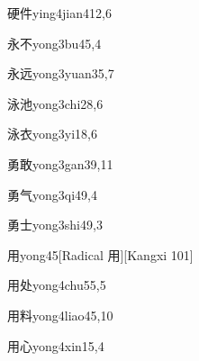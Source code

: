 \begin{entry}{硬件}{ying4jian4}{12,6}
\end{entry}

\begin{entry}{永不}{yong3bu4}{5,4}
\end{entry}

\begin{entry}{永远}{yong3yuan3}{5,7}
\end{entry}

\begin{entry}{泳池}{yong3chi2}{8,6}
\end{entry}

\begin{entry}{泳衣}{yong3yi1}{8,6}
\end{entry}

\begin{entry}{勇敢}{yong3gan3}{9,11}
\end{entry}

\begin{entry}{勇气}{yong3qi4}{9,4}
\end{entry}

\begin{entry}{勇士}{yong3shi4}{9,3}
\end{entry}

\begin{entry}{用}{yong4}{5}[Radical 用][Kangxi 101]
\end{entry}

\begin{entry}{用处}{yong4chu5}{5,5}
\end{entry}

\begin{entry}{用料}{yong4liao4}{5,10}
\end{entry}

\begin{entry}{用心}{yong4xin1}{5,4}
\end{entry}

